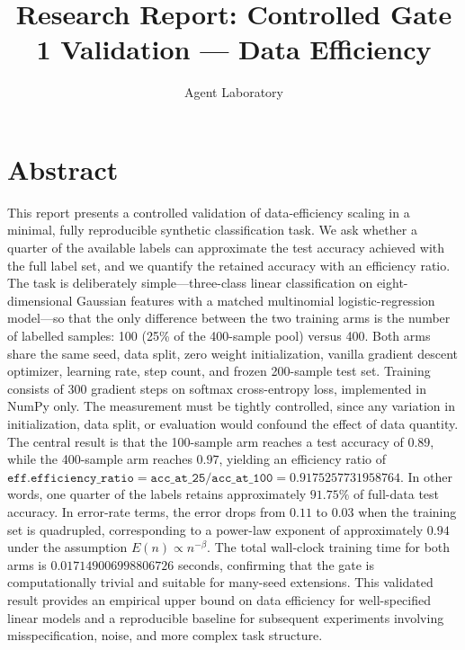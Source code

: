 \documentclass[10pt]{article}
\title{\textbf{Research Report: Controlled Gate 1 Validation --- Data Efficiency}}
\author{Agent Laboratory}
\date{}
\begin{document}
\maketitle

\section{Abstract}
This report presents a controlled validation of data-efficiency scaling in a minimal, fully reproducible synthetic classification task. We ask whether a quarter of the available labels can approximate the test accuracy achieved with the full label set, and we quantify the retained accuracy with an efficiency ratio. The task is deliberately simple---three-class linear classification on eight-dimensional Gaussian features with a matched multinomial logistic-regression model---so that the only difference between the two training arms is the number of labelled samples: 100 (25\% of the 400-sample pool) versus 400. Both arms share the same seed, data split, zero weight initialization, vanilla gradient descent optimizer, learning rate, step count, and frozen 200-sample test set. Training consists of 300 gradient steps on softmax cross-entropy loss, implemented in NumPy only. The measurement must be tightly controlled, since any variation in initialization, data split, or evaluation would confound the effect of data quantity. The central result is that the 100-sample arm reaches a test accuracy of \(0.89\), while the 400-sample arm reaches \(0.97\), yielding an efficiency ratio of \(\texttt{eff.efficiency\_ratio} = \texttt{acc\_at\_25} / \texttt{acc\_at\_100} = 0.9175257731958764\). In other words, one quarter of the labels retains approximately \(91.75\%\) of full-data test accuracy. In error-rate terms, the error drops from \(0.11\) to \(0.03\) when the training set is quadrupled, corresponding to a power-law exponent of approximately \(0.94\) under the assumption \(E(n) \propto n^{-\beta}\). The total wall-clock training time for both arms is \(0.017149006998806726\) seconds, confirming that the gate is computationally trivial and suitable for many-seed extensions. This validated result provides an empirical upper bound on data efficiency for well-specified linear models and a reproducible baseline for subsequent experiments involving misspecification, noise, and more complex task structure.
\end{document}
